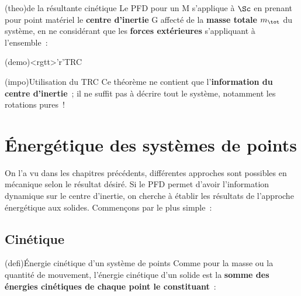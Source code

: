 \documentclass[../../main/main.tex]{subfiles}
\begin{document}
\begin{tcbraster}[raster columns=2, raster equal height=rows, raster
		valign=top]%
	\begin{tcb*}(theo){de la résultante cinétique}
		Le PFD pour un M s'applique à $\Sc$ en prenant pour point matériel le
		\textbf{centre d'inertie} G affecté de la \textbf{masse totale} $m_{\tot}$
		du système, en ne considérant que les \textbf{forces extérieures}
		s'appliquant à l'ensemble~:
		\psw{
			\[
				\boxed{\dv{\pf\Rg(\Sc)}{t} = m_{\tot}\dv{\vf(\Gr)}{t} = \Ff_{\ext}}
			\]
		}
		\vspace{-15pt}
	\end{tcb*}%
	\begin{tcb*}(demo)<rgtt>'r'{TRC}
	\end{tcb*}
\end{tcbraster}
\begin{tcb*}(impo){Utilisation du TRC}
	Ce théorème ne contient que l'\textbf{information du centre d'inertie}~; il ne
	suffit pas à décrire tout le système, notamment les rotations pures~!
\end{tcb*}

\section{Énergétique des systèmes de points}
On l'a vu dans les chapitres précédents, différentes approches sont possibles en
mécanique selon le résultat désiré. Si le PFD permet d'avoir l'information
dynamique sur le centre d'inertie, on cherche à établir les résultats de
l'approche énergétique aux solides. Commençons par le plus simple~:
\subsection{Cinétique}
\begin{tcb*}(defi){Énergie cinétique d'un système de points}
	Comme pour la masse ou la quantité de mouvement, l'énergie cinétique d'un
	solide est la \textbf{somme des énergies cinétiques de chaque point le
		constituant}~:
	\psw{
	\[
		\boxed{\Ec_{c/\Rc}(\Sc) = \sum_i\Ec_{c/\Rc}(\Mr_i) = \sum_i
		\frac{1}{2}m_iv_{i/\Rc}{}^2}
	\]
	}
	\vspace{-15pt}
\end{tcb*}
\end{document}
